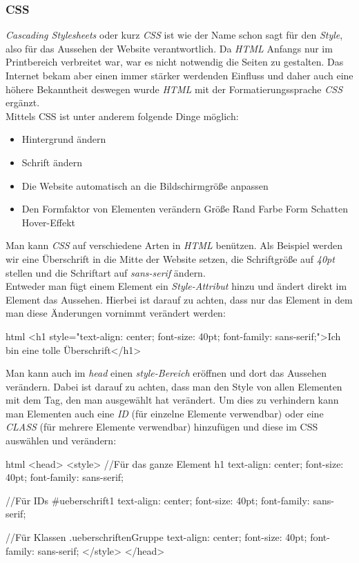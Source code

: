 		\subsubsection{CSS}
		\textit{Cascading Stylesheets} oder kurz \textit{CSS} ist wie der Name schon sagt für den \textit{Style}, also für das Aussehen der Website verantwortlich. Da \textit{HTML} Anfangs nur im Printbereich verbreitet war, war es nicht notwendig die Seiten zu gestalten. Das Internet bekam aber einen immer stärker werdenden Einfluss und daher auch eine höhere Bekanntheit deswegen wurde \textit{HTML} mit der Formatierungssprache \textit{CSS} ergänzt.\\
		Mittels CSS ist unter anderem folgende Dinge möglich:
		\begin{itemize}
			\item Hintergrund ändern
			\item Schrift ändern
			\item Die Website automatisch an die Bildschirmgröße anpassen
			\item Den Formfaktor von Elementen verändern
			\subitem Größe
			\subitem Rand
			\subitem Farbe
			\subitem Form
			\subitem Schatten
			\subitem Hover-Effekt
		\end{itemize}
		Man kann \textit{CSS} auf verschiedene Arten in \textit{HTML} benützen. Als Beispiel werden wir eine Überschrift in die Mitte der Website setzen, die Schriftgröße auf \textit{40pt} stellen und die Schriftart auf \textit{sans-serif} ändern.\\
		Entweder man fügt einem Element ein \textit{Style-Attribut} hinzu und ändert direkt im Element das Aussehen. Hierbei ist darauf zu achten, dass nur das Element in dem man diese Änderungen vornimmt verändert werden:
		\begin{code}{html}
			<h1 style="text-align: center; font-size: 40pt; font-family: sans-serif;">Ich bin eine tolle Überschrift</h1>
		\end{code}
		Man kann auch im \textit{head} einen \textit{style-Bereich} eröffnen und dort das Aussehen verändern. Dabei ist darauf zu achten, dass man den Style von allen Elementen mit dem Tag, den man ausgewählt hat verändert. Um dies zu verhindern kann man Elementen auch eine \textit{ID} (für einzelne Elemente verwendbar) oder eine \textit{CLASS} (für mehrere Elemente verwendbar) hinzufügen und diese im CSS auswählen und verändern:
		\begin{code}{html}
				<head>
					<style>
					//Für das ganze Element
					h1 {
						text-align: center; 
						font-size: 40pt; 
						font-family: sans-serif;
					}
				
					//Für IDs
					#ueberschrift1 {
						text-align: center; 
						font-size: 40pt; 
						font-family: sans-serif;
					}
					
					//Für Klassen
					.ueberschriftenGruppe {
						text-align: center; 
						font-size: 40pt; 
						font-family: sans-serif;
					}
					</style>
				</head>
		\end{code}
